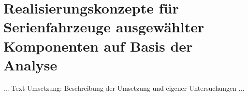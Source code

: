 \chapter{Realisierungskonzepte für Serienfahrzeuge ausgewählter Komponenten auf Basis der Analyse}
\label{cha:Konzeptentwurf}

... Text Umsetzung: Beschreibung der Umsetzung und eigener Untersuchungen ...
